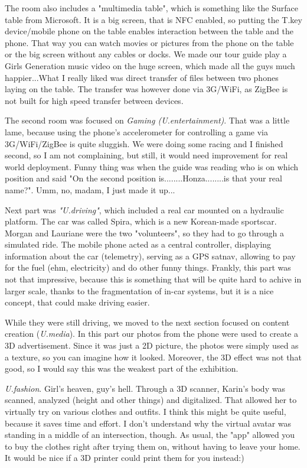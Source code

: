 \begin{post}
\begin{content}
The room also includes a "multimedia table", which is something like the Surface table from Microsoft. It is a big screen, that is NFC enabled, so putting the T.key device/mobile phone on the table enables interaction between the table and the phone. That way you can watch movies or pictures from the phone on the table or the big screen without any cables or docks. We made our tour guide play a Girls Generation music video on the huge screen, which made all the guys much happier...What I really liked was direct transfer of files between two phones laying on the table. The transfer was however done via 3G/WiFi, as ZigBee is not built for high speed transfer between devices.

The second room was focused on \textit{Gaming (U.entertainment)}. That was a little lame, because using the phone's accelerometer for controlling a game via 3G/WiFi/ZigBee is quite sluggish. We were doing some racing and I finished second, so I am not complaining, but still, it would need improvement for real world deployment. Funny thing was when the guide was reading who is on which position and said "On the second position is........Honza........is that your real name?". Umm, no, madam, I just made it up...

Next part was \textit{"U.driving"}, which included a real car mounted on a hydraulic platform. The car was called Spira, which is a new Korean-made sportscar. Morgan and Lauriane were the two "volunteers", so they had to go through a simulated ride. The mobile phone acted as a central controller, displaying information about the car (telemetry), serving as a GPS satnav, allowing to pay for the fuel (ehm, electricity) and do other funny things. Frankly, this part was not that impressive, because this is something that will be quite hard to achive in larger scale, thanks to the fragmentation of in-car systems, but it is a nice concept, that could make driving easier.

While they were still driving, we moved to the next section focused on content creation (\textit{U.media}). In this part our photos from the phone were used to create a 3D advertisement. Since it was just a 2D picture, the photos were simply used as a texture, so you can imagine how it looked. Moreover, the 3D effect was not that good, so I would say this was the weakest part of the exhibition.

\textit{U.fashion}. Girl's heaven, guy's hell. Through a 3D scanner, Karin's body was scanned, analyzed (height and other things) and digitalized. That allowed her to virtually try on various clothes and outfits. I think this might be quite useful, because it saves time and effort. I don't understand why the virtual avatar was standing in a middle of an intersection, though. As usual, the "app" allowed you to buy the clothes right after trying them on, without having to leave your home. It would be nice if a 3D printer could print them for you instead:)


\end{content}
\end{post}
